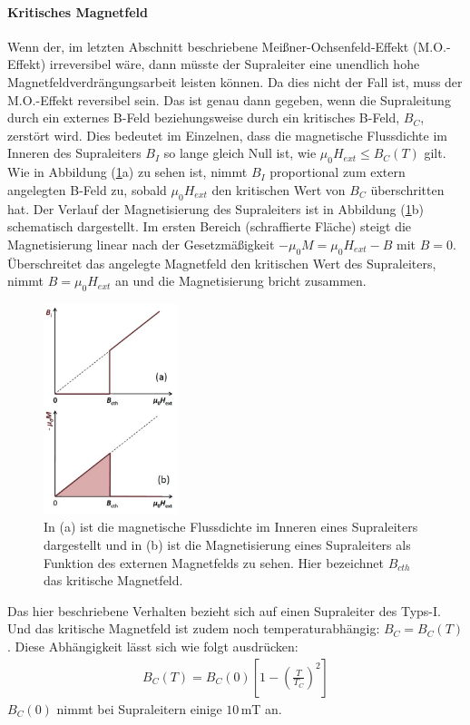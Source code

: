 \paragraph{Kritisches Magnetfeld}
Wenn der, im letzten Abschnitt beschriebene Mei{\ss}ner-Och{\-}sen{\-}feld-Effekt (M.O.-Effekt) irreversibel w\"{a}re, dann m\"{u}sste der Supraleiter eine unendlich hohe Magnetfeldverdrängungsarbeit leisten k\"{o}nnen.
Da dies nicht der Fall ist, muss der M.O.-Effekt reversibel sein.
Das ist genau dann gegeben, wenn die Supraleitung durch ein externes B-Feld beziehungsweise durch ein kritisches B-Feld, $B_C$, zerst\"{o}rt wird.
Dies bedeutet im Einzelnen, dass die magnetische Flussdichte im Inneren des Supraleiters $B_I$ so lange gleich Null ist, wie $\mu_0H_{ext} \leq B_C(T)$ gilt.
Wie in Abbildung (\ref{abb:kritischesBFeld}a) zu sehen ist, nimmt $B_I$ proportional zum extern angelegten B-Feld zu, sobald $\mu_0H_{ext}$ den kritischen Wert von $B_C$ \"{u}berschritten hat.
Der Verlauf der Magnetisierung des Supraleiters ist in Abbildung (\ref{abb:kritischesBFeld}b) schematisch dargestellt.
Im ersten Bereich (schraffierte Fl\"{a}che) steigt die Magnetisierung linear nach der Gesetzm\"{a}{\ss}igkeit $-\mu_0M = \mu_0H_{ext} - B$ mit $B = 0$.
\"Uberschreitet das angelegte Magnetfeld den kritischen Wert des Supraleiters, nimmt $B = \mu_0H_{ext}$ an und die Magnetisierung bricht zusammen.
\begin{figure}
	\centering
	\includegraphics[width=0.35\textwidth]{Plots/kritischesBFeld.png}
 	\caption{In (a) ist die magnetische Flussdichte im Inneren eines Supraleiters dargestellt und in (b) ist die Magnetisierung eines Supraleiters als Funktion des externen Magnetfelds zu sehen. Hier bezeichnet $B_{cth}$ das kritische Magnetfeld. \cite{einleitung}}
	\label{abb:kritischesBFeld}
\end{figure}
Das hier beschriebene Verhalten bezieht sich auf einen Supraleiter des Typs-I.
Und das kritische Magnetfeld ist zudem noch temperaturabh\"{a}ngig: $B_C = B_C(T)$.
Diese Abh\"{a}ngigkeit l\"{a}sst sich wie folgt ausdr\"{u}cken:
\begin{align*}
	B_C(T) = B_C(0) \left[ 1 - \left( \frac{T}{T_C} \right)^2 \right]
\end{align*}
$B_C(0)$ nimmt bei Supraleitern einige $10 \, $mT an.

